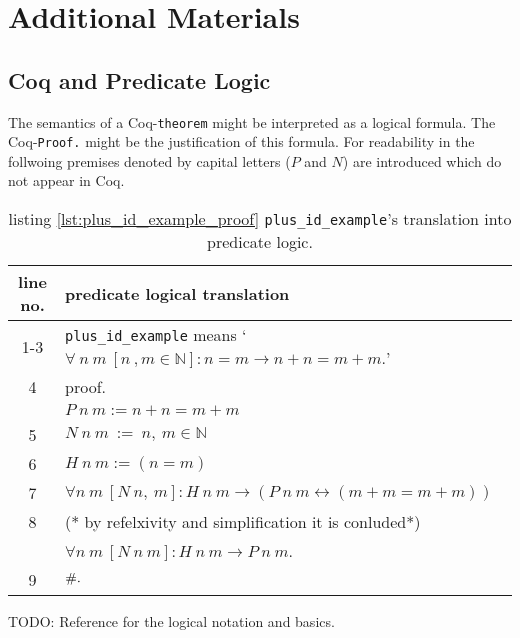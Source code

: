 \section{Additional Materials}\label{app:AdditionalMaterials}

\subsection{Coq and Predicate Logic} \label{subsec:CoqAndPredicateLogic}
	The semantics of a Coq-\lstinline!theorem! might be interpreted as a logical formula.
	The Coq-\lstinline!Proof.! might be the justification of this formula. 
	For readability in the follwoing premises denoted by capital letters ($P$ and $N$) are introduced which do not appear in Coq.
	\begin{table}[h]
		\begin{center}
			\begin{tabular}{|c|l|}
			    \hline
	 			line no.  &  predicate logical translation \\  \hline
		     	  1-3    %
		                  & \lstinline!plus_id_example! means `$ \forall\ n\ m\ [n\ , m \in \mathbb{N}]: n = m \rightarrow n+n = m+m.$'\\ \hline        
		     	  4       & proof. \\     	     	      	                      
		                  &   $ P\ n\ m:= n+n = m+m$    \\ \hline
		          5       &   $N \ n \ m \ := \ n,\ m \in \mathbb{N}$       \\ \hline       
		          6       &   $ H\ n\ m :=( n= m)$ \\        
		    	      7       &   $ \forall n \ m\ [N \ n,\ m]: H\ n\ m \rightarrow (P\ n\ m \leftrightarrow( m+m = m+m))$\\   \hline 
		          8       &   (* by refelxivity and simplification it is conluded*) \\
		                  & $\forall n\ m\ [ N\ n\ m]: H\ n\ m  \rightarrow P\ n\ m$.  \\  \hline
		          9       & $\qed.$\\ \hline        	          
	        		\end{tabular}
		\end{center}
		\label{tab:CoqAndPreciateLogic}
		\caption{listing \ref{lst:plus_id_example_proof} \lstinline!plus_id_example!'s translation into predicate logic.} 
	\end{table}

TODO: Reference for the logical notation and basics.